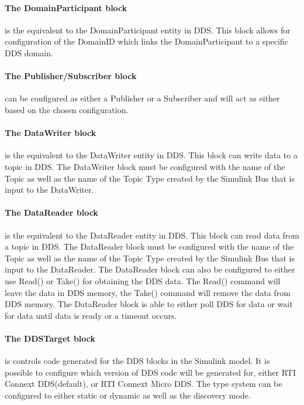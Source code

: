 \paragraph{The DomainParticipant block} is the equivalent to the DomainParticipant entity in DDS. This block allows for configuration of the DomainID which links the DomainParticipant to a specific DDS domain.

\paragraph{The Publisher/Subscriber block} can be configured as either a Publisher or a Subscriber and will act as either based on the chosen configuration.

\paragraph{The DataWriter block} is the equivalent to the DataWriter entity in DDS. This block can write data to a topic in DDS. The DataWriter block must be configured with the name of the Topic as well as the name of the Topic Type created by the Simulink Bus that is input to the DataWriter.

\paragraph{The DataReader block} is the equivalent to the DataReader entity in DDS. This block can read data from a topic in DDS. The DataReader block must be configured with the name of the Topic as well as the name of the Topic Type created by the Simulink Bus that is input to the DataReader. The DataReader block can also be configured to either use Read() or Take() for obtaining the DDS data. The Read() command will leave the data in DDS memory, the Take() command will remove the data from DDS memory. The DataReader block is able to either poll DDS for data or wait for data until data is ready or a timeout occurs.

\paragraph{The DDSTarget block} is controls code generated for the DDS blocks in the Simulink model. It is possible to configure which version of DDS code will be generated for, either RTI Connext DDS(default), or RTI Connext Micro DDS. The type system can be configured to either static or dynamic as well as the discovery mode.

